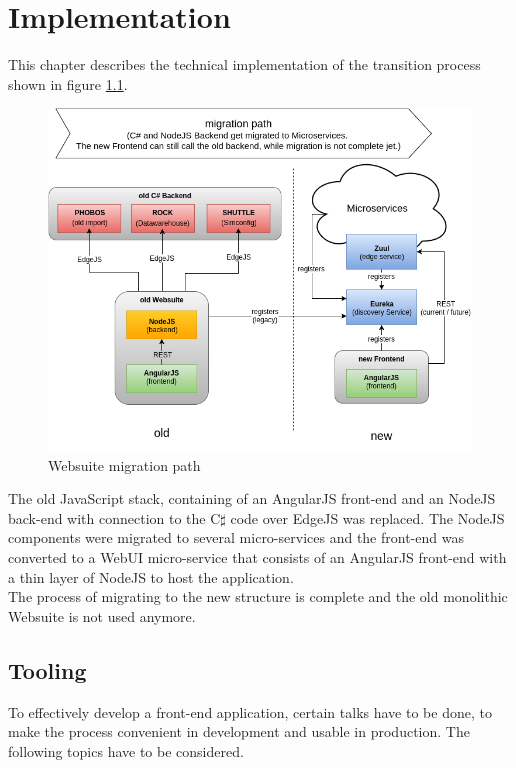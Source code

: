 
\chapter{Implementation}
This chapter describes the technical implementation of the transition process shown in figure \ref{fig:websuite-migration}.
\begin{figure}[H]
	\centering\includegraphics[width=1\textwidth]{res/Websuite_migration}
	\caption{Websuite migration path}
	\label{fig:websuite-migration}
\end{figure}

The old JavaScript stack, containing of an AngularJS front-end and an NodeJS back-end with connection to the C$\sharp$ code over EdgeJS was replaced. The NodeJS components were migrated to several micro-services and the front-end was converted to a WebUI micro-service that consists of an AngularJS front-end with a thin layer of NodeJS to host the application.\\
The process of migrating to the new structure is complete and the old monolithic Websuite is not used anymore.



\section{Tooling}
To effectively develop a front-end application, certain talks have to be done, to make the process convenient in development and usable in production. The following topics have to be considered.


